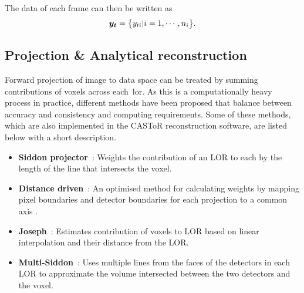 The data of each frame can then be written as
\begin{equation}
   \bm{y_t} = \big\{ {y_{ti}| i=1,\cdots,n_i} \big\} \\.
\end{equation}
%
\subsection{Projection \& Analytical reconstruction}
Forward projection of image to data space can be treated by summing contributions of voxels across each~\gls{lor}. %
As this is a computationally heavy process in practice, different methods have been proposed that balance between accuracy and consistency and computing requirements. %
Some of these methods, which are also implemented in the CASToR reconstruction software, are listed below with a short description.
\begin{itemize}
\item  \textbf{Siddon projector}~\cite{Siddon1985}: Weights the contribution of an LOR to each by the length of the line that intersects the voxel.
\item  \textbf{Distance driven}~\cite{DeMan2004}: An optimised method for calculating weights by mapping pixel boundaries and detector boundaries for each projection to a common axis .
\item  \textbf{Joseph}~\cite{Joseph1982}: Estimates contribution of voxels to LOR based on linear interpolation and their distance from the LOR. 
\item  \textbf{Multi-Siddon}~\cite{Moehrs2008}: Uses multiple lines from the faces of the detectors in each LOR to approximate the volume intersected between the two detectors and the voxel.
\end{itemize}

